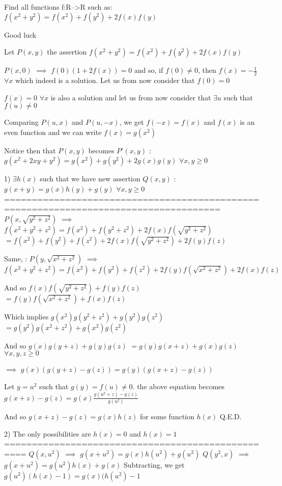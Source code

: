 \begin{solution}
	\begin{tcolorbox}Find all functions f:R-->R such as:
$ f(x^2+y^2)=f(x^2)+f(y^2)+2f(x)f(y)$

Good luck\end{tcolorbox}
Let $P(x,y)$ the assertion $f(x^2+y^2)=f(x^2)+f(y^2)+2f(x)f(y)$

$P(x,0)$ $\implies$ $f(0)(1+2f(x))=0$ and so, if $f(0)\ne 0$, then $f(x)=-\frac 12$ $\forall x$ which indeed is a solution.
Let us from now consider that $f(0)=0$

$f(x)=0$ $\forall x$ is also a solution and let us from now consider that $\exists u$ such that $f(u)\ne 0$

Comparing $P(u,x)$ and $P(u,-x)$, we get $f(-x)=f(x)$ and $f(x)$ is an even function and we can write $f(x)=g(x^2)$

Notice then that $P(x,y)$ becomes $P'(x,y)$ : $g(x^2+2xy+y^2)=g(x^2)+g(y^2)+2g(x)g(y)$ $\forall x,y\ge 0$

1) $\exists h(x)$ such that we have new assertion $Q(x,y)$ : $g(x+y)=g(x)h(y)+g(y)$ $\forall x,y\ge 0$
=====================================================================================
$P(x,\sqrt{y^2+z^2})$ $\implies$ $f(x^2+y^2+z^2)=f(x^2)+f(y^2+z^2)+2f(x)f(\sqrt{y^2+z^2})$ $=f(x^2)+f(y^2)+f(z^2)+2f(x)f(\sqrt{y^2+z^2})+2f(y)f(z)$

Same, : $P(y,\sqrt{x^2+z^2})$ $\implies$ $f(x^2+y^2+z^2)=f(x^2)+f(y^2)+f(z^2)+2f(y)f(\sqrt{x^2+z^2})+2f(x)f(z)$

And so $f(x)f(\sqrt{y^2+z^2})+f(y)f(z)$ $=f(y)f(\sqrt{x^2+z^2})+f(x)f(z)$

Which implies $g(x^2)g(y^2+z^2)+g(y^2)g(z^2)$ $=g(y^2)g(x^2+z^2)+g(x^2)g(z^2)$

And so $g(x)g(y+z)+g(y)g(z)$ $=g(y)g(x+z)+g(x)g(z)$ $\forall x,y,z\ge 0$

$\implies$ $g(x)(g(y+z)-g(z))=g(y)(g(x+z)-g(z))$

Let $y=u^2$ such that $g(y)=f(u)\ne 0$. the above equation becomes $g(x+z)-g(z)=g(x)\frac{g(u^2+z)-g(z)}{g(u^2)}$

And so $g(x+z)-g(z)=g(x)h(z)$ for some function $h(x)$
Q.E.D.

2) The only possibilities are $h(x)=0$ and $h(x)=1$
==================================================
$Q(x,u^2)$ $\implies$ $g(x+u^2)=g(x)h(u^2)+g(u^2)$
$Q(y^2,x)$ $\implies$ $g(x+u^2)=g(u^2)h(x)+g(x)$
Subtracting, we get ${g(u^2)(h(x)-1)=g(x)(h(u^2)-1}$


\end{solution}
